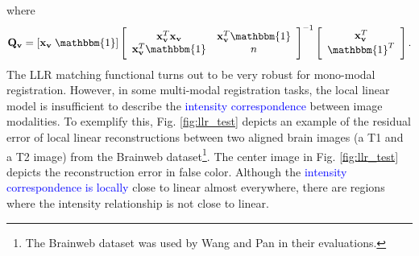 \vspace{-0.2cm}
where
\vspace{-0.2cm}
\begin{equation}\label{eq:def_P_v}
    \mathbf{Q_v} = [\mathbf{x}_{\mathbf{v}} \; \mathbbm{1}]
    \left[\begin{array}{cc}
        \mathbf{x}_{\mathbf{v}}^{T}\mathbf{x}_{\mathbf{v}} & \mathbf{x}_{\mathbf{v}}^{T}\mathbbm{1}\\
        \mathbf{x}_{\mathbf{v}}^{T}\mathbbm{1} & n
    \end{array}\right]^{-1}
    \left[\begin{array}{c}
        \mathbf{x}_{\mathbf{v}}^{T}\\
        \mathbbm{1}^{T}
    \end{array}\right].
\end{equation}
The LLR matching functional turns out to be very robust for mono-modal registration. However, in some multi-modal registration tasks, the local linear model is insufficient to describe the \textcolor{blue}{intensity correspondence} between image modalities. To exemplify this, Fig. \ref{fig:llr_test} depicts an example of the residual error of local linear reconstructions between two aligned brain images (a T1 and a T2 image) from the Brainweb \cite{Cocosco1997} dataset\footnote{The Brainweb dataset was used by Wang and Pan \cite{Wang2014} in their evaluations.}. The center image in Fig. \ref{fig:llr_test} depicts the reconstruction error in false color. Although the \textcolor{blue}{ intensity correspondence is locally} close to linear almost everywhere, there are regions where the intensity relationship is not close to linear.\\


